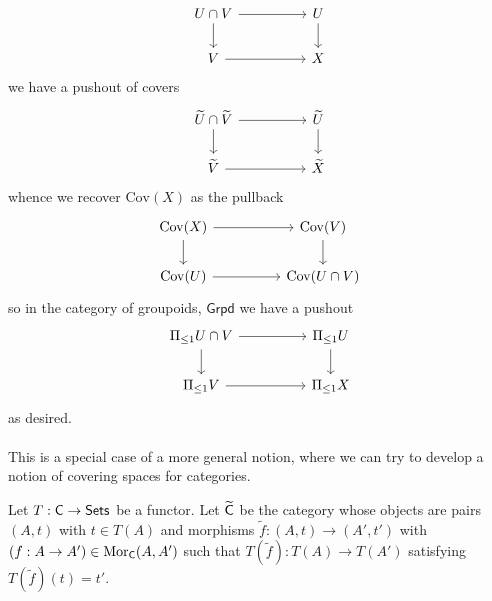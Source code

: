 $$%
\begin{tikzcd}
	{U\cap V} && U \\
	V && X
	\arrow[from=1-1, to=1-3]
	\arrow[from=1-3, to=2-3]
	\arrow[from=1-1, to=2-1]
	\arrow[from=2-1, to=2-3]
\end{tikzcd}$$
we have a pushout of covers 
$$%
\begin{tikzcd}
	{\widetilde{U}\cap\widetilde{V}} && {\widetilde{U}} \\
	{\widetilde{V}} && {\widetilde{X}}
	\arrow[from=1-1, to=1-3]
	\arrow[from=1-3, to=2-3]
	\arrow[from=1-1, to=2-1]
	\arrow[from=2-1, to=2-3]
\end{tikzcd}$$
whence we recover $\mathrm{Cov}(X)$ as the pullback 
$$%
\begin{tikzcd}
	{\mathrm{Cov}(X)} && {\mathrm{Cov}(V)} \\
	{\mathrm{Cov}(U)} && {\mathrm{Cov}(U\cap V)}
	\arrow[from=1-1, to=1-3]
	\arrow[from=1-3, to=2-3]
	\arrow[from=1-1, to=2-1]
	\arrow[from=2-1, to=2-3]
\end{tikzcd}$$
so in the category of groupoids, $\mathsf{Grpd}$ we have a pushout 
$$%
\begin{tikzcd}
	{\Pi_{\leq1}U\cap V} && {\Pi_{\leq1}U} \\
	{\Pi_{\leq1}V} && {\Pi_{\leq1}X}
	\arrow[from=1-1, to=1-3]
	\arrow[from=1-3, to=2-3]
	\arrow[from=1-1, to=2-1]
	\arrow[from=2-1, to=2-3]
\end{tikzcd}$$
as desired. 
\\\\
This is a special case of a more general notion, where we can try to develop a notion of covering spaces for categories. 
\begin{definition}
    Let $T:\mathsf{C}\to\mathsf{Sets}$ be a functor. Let $\widetilde{\mathsf{C}}$ be the category whose objects are pairs $(A,t)$ with $t\in T(A)$ and morphisms $\widetilde{f}:(A,t)\to(A',t')$ with $(f:A\to A')\in\mathrm{Mor}_{\mathsf{C}}(A,A')$ such that $T(\widetilde{f}):T(A)\to T(A')$ satisfying $T(\widetilde{f})(t)=t'$. 
\end{definition}
